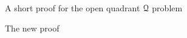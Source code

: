 \documentclass[11pt, a4paper, english, twoside, notitlepage, openright]{report}
\begin{document}
\begin{chapter}{A short proof for the open quadrant $\mathcal{Q}$ problem}
\begin{section}{The new proof}

\end{section}
\end{chapter}
\end{document}
